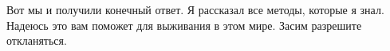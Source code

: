 \vspace{2cm}
Вот мы и получили конечный ответ. Я рассказал все методы, которые я знал. Надеюсь это вам поможет для выживания в этом мире. Засим разрешите откланяться.
 
